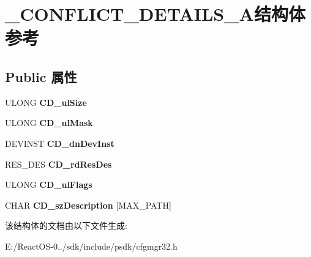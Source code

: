 \hypertarget{struct___c_o_n_f_l_i_c_t___d_e_t_a_i_l_s___a}{}\section{\+\_\+\+C\+O\+N\+F\+L\+I\+C\+T\+\_\+\+D\+E\+T\+A\+I\+L\+S\+\_\+\+A结构体 参考}
\label{struct___c_o_n_f_l_i_c_t___d_e_t_a_i_l_s___a}
\subsection*{Public 属性}
\begin{DoxyCompactItemize}
\item 
\mbox{\label{struct___c_o_n_f_l_i_c_t___d_e_t_a_i_l_s___a_acf771812501f25c64b862f3a39ebfccb}} 
U\+L\+O\+NG {\bfseries C\+D\+\_\+ul\+Size}
\item 
\mbox{\label{struct___c_o_n_f_l_i_c_t___d_e_t_a_i_l_s___a_a539c9937622a9511378c42033bec1fc5}} 
U\+L\+O\+NG {\bfseries C\+D\+\_\+ul\+Mask}
\item 
\mbox{\label{struct___c_o_n_f_l_i_c_t___d_e_t_a_i_l_s___a_ae56c2fb3aa92b09f94278f3242f41f0c}} 
D\+E\+V\+I\+N\+ST {\bfseries C\+D\+\_\+dn\+Dev\+Inst}
\item 
\mbox{\label{struct___c_o_n_f_l_i_c_t___d_e_t_a_i_l_s___a_a3362ba23debc8e2fbb65d9e8f95b6e0f}} 
R\+E\+S\+\_\+\+D\+ES {\bfseries C\+D\+\_\+rd\+Res\+Des}
\item 
\mbox{\label{struct___c_o_n_f_l_i_c_t___d_e_t_a_i_l_s___a_a46b7fca576f2d04c07e0b48716033416}} 
U\+L\+O\+NG {\bfseries C\+D\+\_\+ul\+Flags}
\item 
\mbox{\label{struct___c_o_n_f_l_i_c_t___d_e_t_a_i_l_s___a_a13808d294a3e5b231c38b8b1b77e7b2f}} 
C\+H\+AR {\bfseries C\+D\+\_\+sz\+Description} \mbox{[}M\+A\+X\+\_\+\+P\+A\+TH\mbox{]}
\end{DoxyCompactItemize}


该结构体的文档由以下文件生成\+:\begin{DoxyCompactItemize}
\item 
E\+:/\+React\+O\+S-\/0../sdk/include/psdk/cfgmgr32.\+h\end{DoxyCompactItemize}
